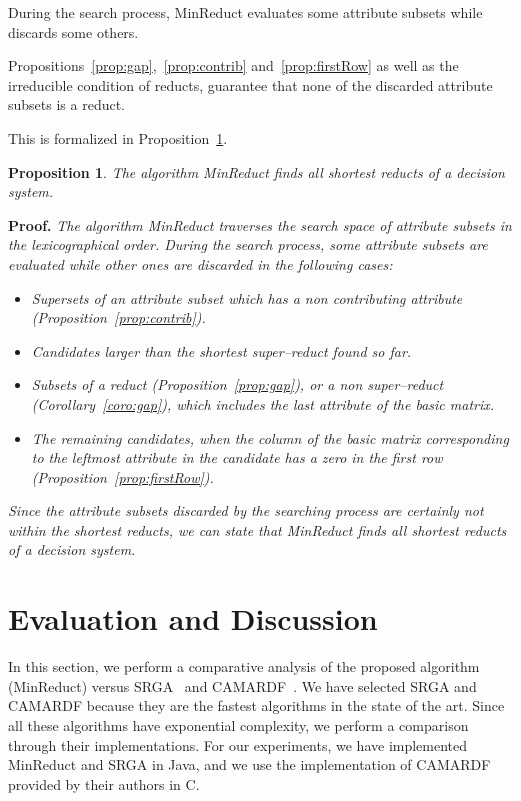\documentclass[authoryear,preprint,review,12pt]{elsarticle}
\newtheorem{proposition}{Proposition}
\begin{document}
	
	During the search process, MinReduct evaluates some attribute subsets while discards some others.
	
	Propositions~\ref{prop:gap},~\ref{prop:contrib} and~\ref{prop:firstRow} as well as the irreducible condition of reducts, guarantee that none of the discarded attribute subsets is a reduct. 
	
	This is formalized in Proposition~\ref{prop:findall}.
	
	\begin{proposition}\label{prop:findall}
		The algorithm MinReduct finds all shortest reducts of a decision system.
	\end{proposition}
	
	\noindent
	\textbf{Proof.} \textit{The algorithm MinReduct traverses the search space of attribute subsets in the lexicographical order. During the search process, some attribute subsets are evaluated while other ones are discarded in the following cases:}
	\begin{itemize}
		
		\item \textit{Supersets of an attribute subset which has a non contributing attribute (Proposition~\ref{prop:contrib}).}
		\item \textit{Candidates larger than the shortest super--reduct found so far.}
		\item \textit{Subsets of a reduct (Proposition~\ref{prop:gap}), or a non super--reduct (Corollary~\ref{coro:gap}), which includes the last attribute of the basic matrix.}
		\item \textit{The remaining candidates, when the column of the basic matrix corresponding to the leftmost attribute in the candidate has a zero in the first row (Proposition~\ref{prop:firstRow}).}
		
	\end{itemize} 
	\textit{Since the attribute subsets discarded by the searching process are certainly not within the shortest reducts, we can state that MinReduct finds all shortest reducts of a decision system.}
	
	
\section{Evaluation and Discussion}\label{evaluation}
	In this section, we perform a comparative analysis of the proposed algorithm (MinReduct) versus SRGA~\citep{Susmaga} and CAMARDF~\citep{Zhou2009}. We have selected SRGA and CAMARDF because they are the fastest algorithms in the state of the art. Since all these algorithms have exponential complexity, we perform a comparison through their implementations. For our experiments, we have implemented MinReduct and SRGA in Java, and we use the implementation of CAMARDF provided by their authors in C. 
	
\end{document}
